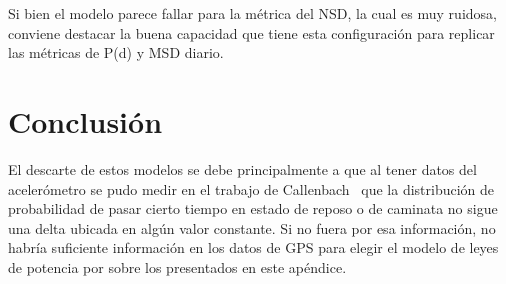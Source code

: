 Si bien el modelo parece fallar para la métrica del NSD, la cual es muy ruidosa, conviene destacar la buena capacidad que tiene esta configuración para replicar
las métricas de P(d) y MSD diario.

\section*{Conclusión}

El descarte de estos modelos se debe principalmente a que al tener datos del acelerómetro se pudo medir en el trabajo de Callenbach~\cite{callenbach2025} 
que la distribución de probabilidad de pasar cierto tiempo en estado de reposo o de caminata no sigue una delta ubicada en algún valor constante.
Si no fuera por esa información, no habría suficiente información en los datos de GPS para elegir el modelo de leyes de potencia por sobre los presentados en este apéndice.

